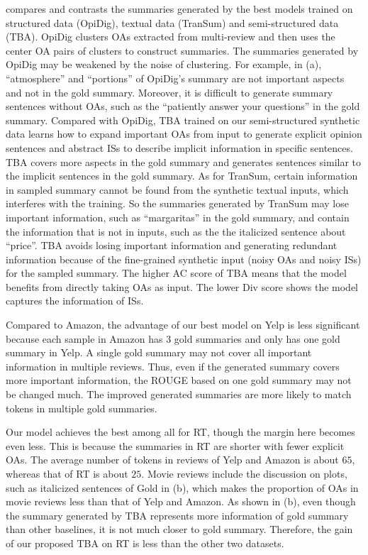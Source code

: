  compares and contrasts the summaries generated by the best models trained on 
structured data (OpiDig), textual data (TranSum) and semi-structured data (TBA).
OpiDig clusters OAs extracted from multi-review and then uses the center OA pairs of clusters to construct summaries.
The summaries generated by OpiDig may be weakened by the noise of clustering.
For example, in (a), ``atmosphere'' and ``portions'' of OpiDig's summary are not important 
aspects and not in the gold summary.
Moreover, it is difficult to generate summary sentences without OAs, such as the ``patiently answer your questions'' in the 
gold summary.  
Compared with OpiDig,
TBA trained on our semi-structured synthetic data learns how to expand important OAs from input 
to generate explicit opinion sentences and abstract ISs to describe implicit information in specific sentences.
TBA covers more aspects in the gold summary and generates sentences similar to the 
implicit sentences in the gold summary.
As for TranSum, certain information in sampled summary cannot be found from the synthetic textual inputs, which interferes with the training.
So the summaries generated by TranSum may lose important information, such as ``margaritas'' in the gold summary, and 
contain the information that is not in inputs, such as the 
the italicized sentence about ``price''.
TBA avoids losing important information and generating redundant information because of the fine-grained 
synthetic input (noisy OAs and noisy ISs) for the sampled summary.
The higher AC score of TBA means
that the model benefits from directly taking OAs as input.
The lower Div score shows the model captures the information of ISs. 

Compared to Amazon, the advantage of our best model on Yelp is less significant
because each sample in Amazon has 3 gold summaries and only has one gold summary in Yelp.
A single gold summary may not cover all important information in multiple reviews.
Thus, even if the generated summary covers
more important information,
the ROUGE based on one gold summary may not be changed much.
The improved generated summaries are more likely to match tokens in multiple gold summaries. 

Our model achieves the best among all for RT, though the margin here becomes even less.
This is because the summaries in RT are shorter with fewer explicit OAs.
The average number of tokens in reviews of Yelp and Amazon is about $65$, whereas that of RT is about $25$.
Movie reviews include the discussion on plots, such as italicized sentences of Gold in (b),
which makes the proportion of OAs in movie reviews less than that of Yelp and Amazon.
As shown in (b), even though the summary generated by TBA represents more information of gold summary than other baselines,
it is not much closer to gold summary. 
Therefore, the gain of our proposed TBA on RT is less than the other two datasets.

